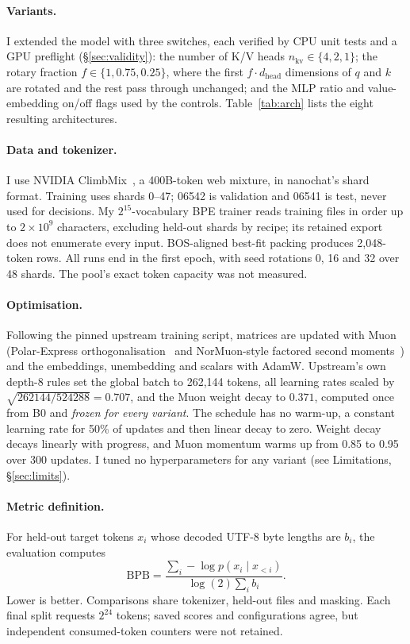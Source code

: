 \documentclass[10pt,twocolumn]{article}
\begin{document}
\paragraph{Variants.}
I extended the model with three switches, each verified by CPU unit tests and a GPU preflight
(\S\ref{sec:validity}): the number of K/V heads $n_\text{kv}\in\{4,2,1\}$; the rotary fraction
$f\in\{1, 0.75, 0.25\}$, where the first $f\cdot d_\text{head}$ dimensions of $q$ and $k$ are rotated and the rest pass
through unchanged; and the MLP ratio and value-embedding on/off flags used by the controls.
Table~\ref{tab:arch} lists the eight resulting architectures.

\paragraph{Data and tokenizer.}
I use NVIDIA ClimbMix~\cite{diao2025climb}, a 400B-token web mixture, in nanochat's shard format.
Training uses shards 0--47; 06542 is validation and 06541 is test, never used for decisions.
My $2^{15}$-vocabulary BPE trainer reads training files in order up to $2\times10^9$ characters, excluding held-out
shards by recipe; its retained export does not enumerate every input. BOS-aligned best-fit packing produces
2{,}048-token rows. All runs end in the first epoch, with seed rotations 0, 16 and 32 over 48 shards.
The pool's exact token capacity was not measured.

\paragraph{Optimisation.}
Following the pinned upstream training script, matrices are updated with Muon~\cite{jordan2024muon} (Polar-Express
orthogonalisation~\cite{amsel2025polar} and NorMuon-style factored second moments~\cite{li2025normuon}) and the
embeddings, unembedding and scalars with AdamW. Upstream's own depth-8 rules set the global batch to 262{,}144
tokens, all learning rates scaled by $\sqrt{262144/524288}=0.707$, and the Muon weight decay to $0.371$, computed once from
B0 and \emph{frozen for every variant}. The schedule has no warm-up, a constant learning rate for 50\% of updates and
then linear decay to zero. Weight decay decays linearly with progress, and Muon momentum warms up from 0.85 to 0.95
over 300 updates. I tuned no hyperparameters for any variant (see Limitations, \S\ref{sec:limits}).

\paragraph{Metric definition.}
For held-out target tokens $x_i$ whose decoded UTF-8 byte lengths are $b_i$, the evaluation computes
\[
\mathrm{BPB}=\frac{\sum_i-\log p(x_i\mid x_{<i})}{\log(2)\sum_i b_i}.
\]
Lower is better. Comparisons share tokenizer, held-out files and masking. Each final split requests $2^{24}$ tokens;
saved scores and configurations agree, but independent consumed-token counters were not retained.
\end{document}
